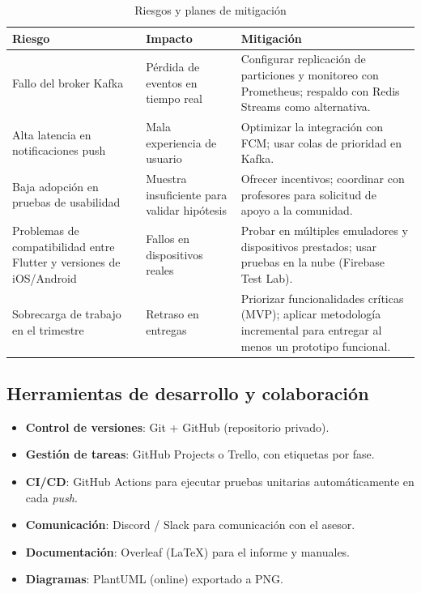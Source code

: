 \begin{table}[H]
\centering
\small
\begin{tabular}{|p{5cm}|p{5cm}|p{5cm}|}
\hline
\textbf{Riesgo} & \textbf{Impacto} & \textbf{Mitigación} \\
\hline
Fallo del broker Kafka & Pérdida de eventos en tiempo real & Configurar replicación de particiones y monitoreo con Prometheus; respaldo con Redis Streams como alternativa. \\
\hline
Alta latencia en notificaciones push & Mala experiencia de usuario & Optimizar la integración con FCM; usar colas de prioridad en Kafka. \\
\hline
Baja adopción en pruebas de usabilidad & Muestra insuficiente para validar hipótesis & Ofrecer incentivos; coordinar con profesores para solicitud de apoyo a la comunidad. \\
\hline
Problemas de compatibilidad entre Flutter y versiones de iOS/Android & Fallos en dispositivos reales & Probar en múltiples emuladores y dispositivos prestados; usar pruebas en la nube (Firebase Test Lab). \\
\hline
Sobrecarga de trabajo en el trimestre & Retraso en entregas & Priorizar funcionalidades críticas (MVP); aplicar metodología incremental para entregar al menos un prototipo funcional. \\
\hline
\end{tabular}
\caption{Riesgos y planes de mitigación}
\label{tab:riesgos}
\end{table}

\subsection{Herramientas de desarrollo y colaboración}

\begin{itemize}
    \item \textbf{Control de versiones}: Git + GitHub (repositorio privado).
    \item \textbf{Gestión de tareas}: GitHub Projects o Trello, con etiquetas por fase.
    \item \textbf{CI/CD}: GitHub Actions para ejecutar pruebas unitarias automáticamente en cada \textit{push}.
    \item \textbf{Comunicación}: Discord / Slack para comunicación con el asesor.
    \item \textbf{Documentación}: Overleaf (LaTeX) para el informe y manuales.
    \item \textbf{Diagramas}: PlantUML (online) exportado a PNG.
\end{itemize}

